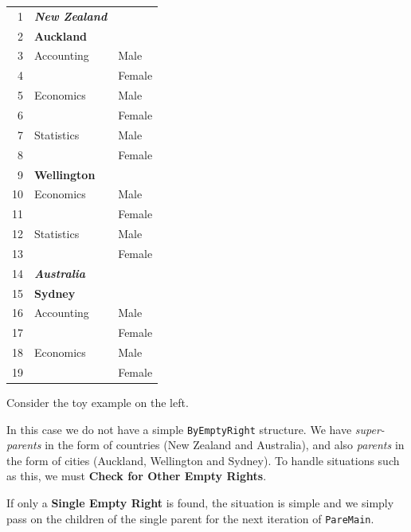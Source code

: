 \documentclass[a4paper]{article}
\begin{document}
\begin{table}[!h]
\begin{minipage}{0.4\linewidth}
  \begin{tabular}{| r | l | l |}
    \hline
     1 & \textbf{\textit{New Zealand}} &        \\
     2 & \textbf{Auckland}             &        \\
     3 & Accounting                    & Male   \\
     4 &                               & Female \\
     5 & Economics                     & Male   \\
     6 &                               & Female \\
     7 & Statistics                    & Male   \\
     8 &                               & Female \\
     9 & \textbf{Wellington}           &        \\
    10 & Economics                     & Male   \\
    11 &                               & Female \\
    12 & Statistics                    & Male   \\
    13 &                               & Female \\
    14 & \textbf{\textit{Australia}}   &        \\
    15 & \textbf{Sydney}               &        \\
    16 & Accounting                    & Male   \\
    17 &                               & Female \\
    18 & Economics                     & Male   \\
    19 &                               & Female \\
    \hline
  \end{tabular}
\end{minipage}
\begin{minipage}{0.6\linewidth}
  Consider the toy example on the left.
  
  In this case we do not have a simple \verb|ByEmptyRight| structure.
  We have \emph{super-parents} in the form of countries (New Zealand
  and Australia), and also \emph{parents} in the form of cities
  (Auckland, Wellington and Sydney). To handle situations such as
  this, we must \textbf{Check for Other Empty Rights}.
  
  If only a \textbf{Single Empty Right} is found, the situation is
  simple and we simply pass on the children of the single parent for
  the next iteration of \verb|PareMain|.
  

\end{minipage}
\end{table}
\end{document}
